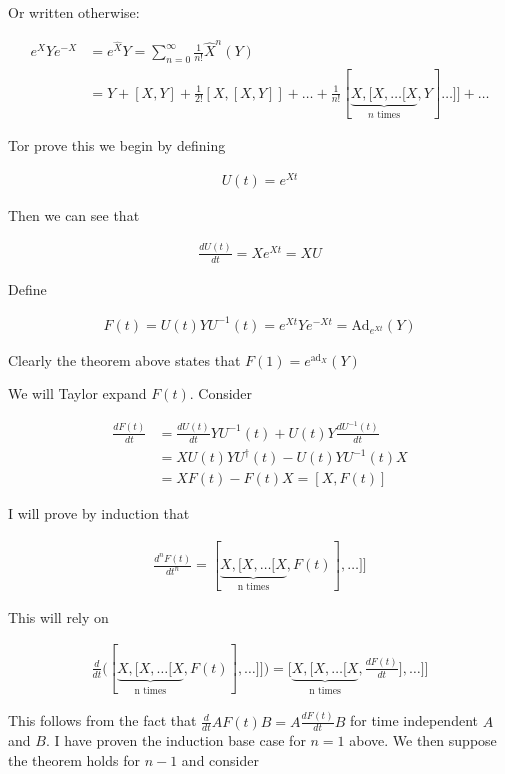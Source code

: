 \documentclass[12pt]{article}
\newcommand{\ddt}[1]{\frac{d #1}{dt}}
\begin{document}
Or written otherwise:

\begin{align}
e^X Y e^{-X} &= e^{\hat{X}}Y =  \sum_{n=0}^{\infty} \frac{1}{n!} \hat{X}^n(Y)\\
&= Y + [X,Y] + \frac{1}{2!} [X,[X,Y]] + \ldots + \frac{1}{n!}[\underbrace{X,[X,\ldots[X}_{n \text{ times}},Y]\ldots]] + \ldots
\end{align}

Tor prove this we begin by defining

\begin{align}
U(t) = e^{X t}
\end{align}

Then we can see that

\begin{align}
\ddt{U(t)} = X e^{Xt} = X U
\end{align}

Define

\begin{align}
F(t) = U(t) Y U^{-1}(t) = e^{Xt} Y e^{-Xt} = \text{Ad}_{e^{Xt}} (Y)
\end{align}

Clearly the theorem above states that $F(1) = e^{\text{ad}_X} (Y)$

We will Taylor expand $F(t)$. Consider

\begin{align}
\ddt{F(t)} &= \ddt{U(t)} Y U^{-1}(t) + U(t) Y \ddt{U^{-1}(t)}\\
&=  X U(t)YU^{\dag}(t) - U(t)YU^{-1}(t) X\\
&= X F(t) - F(t) X = [X,F(t)]
\end{align}

I will prove by induction that

\begin{align}
\frac{d^n F(t)}{dt^n} = [\underbrace{X,[X,\ldots[X}_{\text{n times}},F(t)],\ldots]]
\end{align}

This will rely on

\begin{align}
\ddt{} \big([\underbrace{X,[X,\ldots[X}_{\text{n times}},F(t)],\ldots]] \big) = \Big[\underbrace{X,\Big[X,\ldots\Big[X}_{\text{n times}},\ddt{F(t)}\Big],\ldots\Big]\Big]
\end{align}

This follows from the fact that $\ddt{} AF(t)B = A \ddt{F(t)} B$ for time independent $A$ and $B$. I have proven the induction base case for $n=1$ above. We then suppose the theorem holds for $n-1$ and consider
\end{document}
